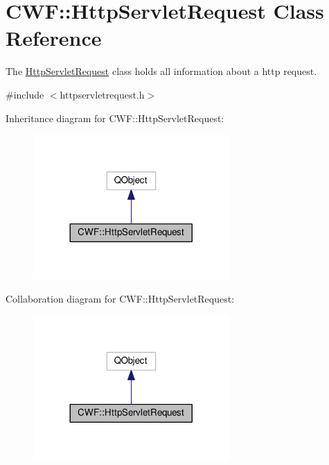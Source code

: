 \hypertarget{class_c_w_f_1_1_http_servlet_request}{\section{C\+W\+F\+:\+:Http\+Servlet\+Request Class Reference}
\label{class_c_w_f_1_1_http_servlet_request}
}


The \hyperlink{class_c_w_f_1_1_http_servlet_request}{Http\+Servlet\+Request} class holds all information about a http request.  




{\ttfamily \#include $<$httpservletrequest.\+h$>$}



Inheritance diagram for C\+W\+F\+:\+:Http\+Servlet\+Request\+:
\nopagebreak
\begin{figure}[H]
\begin{center}
\leavevmode
\includegraphics[width=212pt]{class_c_w_f_1_1_http_servlet_request__inherit__graph}
\end{center}
\end{figure}


Collaboration diagram for C\+W\+F\+:\+:Http\+Servlet\+Request\+:
\nopagebreak
\begin{figure}[H]
\begin{center}
\leavevmode
\includegraphics[width=212pt]{class_c_w_f_1_1_http_servlet_request__coll__graph}
\end{center}
\end{figure}
